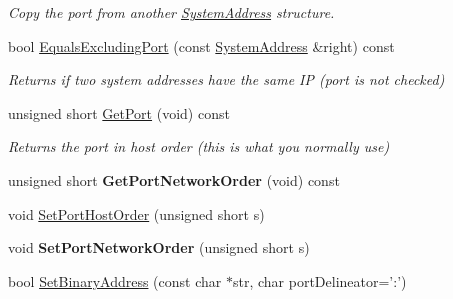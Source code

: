 \begin{DoxyCompactItemize}
\begin{DoxyCompactList}\small\item\em Copy the port from another \hyperlink{struct_rak_net_1_1_system_address}{System\-Address} structure. \end{DoxyCompactList}\item 
\hypertarget{struct_rak_net_1_1_system_address_ad83734278af2a6efcc1f89ea7851571c}{bool \hyperlink{struct_rak_net_1_1_system_address_ad83734278af2a6efcc1f89ea7851571c}{Equals\-Excluding\-Port} (const \hyperlink{struct_rak_net_1_1_system_address}{System\-Address} \&right) const }\label{struct_rak_net_1_1_system_address_ad83734278af2a6efcc1f89ea7851571c}

\begin{DoxyCompactList}\small\item\em Returns if two system addresses have the same I\-P (port is not checked) \end{DoxyCompactList}\item 
\hypertarget{struct_rak_net_1_1_system_address_a9fe44689bf3c863952d25d88c299b215}{unsigned short \hyperlink{struct_rak_net_1_1_system_address_a9fe44689bf3c863952d25d88c299b215}{Get\-Port} (void) const }\label{struct_rak_net_1_1_system_address_a9fe44689bf3c863952d25d88c299b215}

\begin{DoxyCompactList}\small\item\em Returns the port in host order (this is what you normally use) \end{DoxyCompactList}\item 
\hypertarget{struct_rak_net_1_1_system_address_a72de4c0aaebdb7010c28169254756099}{unsigned short {\bfseries Get\-Port\-Network\-Order} (void) const }\label{struct_rak_net_1_1_system_address_a72de4c0aaebdb7010c28169254756099}

\item 
void \hyperlink{struct_rak_net_1_1_system_address_a868e3a83532a57f88436b91bcef8ee7b}{Set\-Port\-Host\-Order} (unsigned short s)
\item 
\hypertarget{struct_rak_net_1_1_system_address_aac99ed395836fde655fadf19f190b8ed}{void {\bfseries Set\-Port\-Network\-Order} (unsigned short s)}\label{struct_rak_net_1_1_system_address_aac99ed395836fde655fadf19f190b8ed}

\item 
\hypertarget{struct_rak_net_1_1_system_address_a6189cd50719060e996d0bcf362ba4f16}{bool \hyperlink{struct_rak_net_1_1_system_address_a6189cd50719060e996d0bcf362ba4f16}{Set\-Binary\-Address} (const char $\ast$str, char port\-Delineator='\-:')}\label{struct_rak_net_1_1_system_address_a6189cd50719060e996d0bcf362ba4f16}


\end{DoxyCompactItemize}
